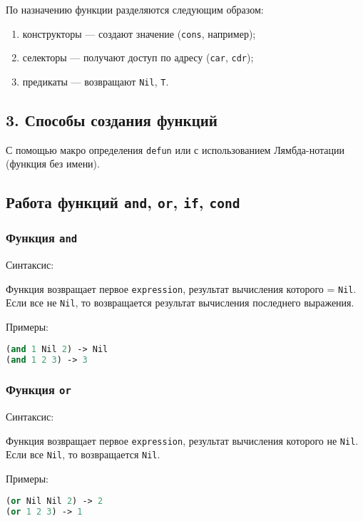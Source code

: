 По назначению функции разделяются следующим образом:
\begin{enumerate}
	\item конструкторы --- создают значение (\texttt{cons}, например);
	\item селекторы --- получают доступ по адресу (\texttt{car}, \texttt{cdr});
	\item предикаты --- возвращают \texttt{Nil}, \texttt{T}.
\end{enumerate}

\subsection*{3. Способы создания функций}

С помощью макро определения \texttt{defun} или с использованием Лямбда-нотации (функция без имени).

\subsection*{Работа функций \texttt{and}, \texttt{or}, \texttt{if}, \texttt{cond}}

\subsubsection*{Функция \texttt{and}}

Синтаксис: 

Функция возвращает первое \texttt{expression}, результат вычисления которого = \texttt{Nil}. Если все не \texttt{Nil}, то возвращается результат вычисления последнего выражения.

Примеры:
\begin{lstlisting}[label=7xd, language=lisp]
(and 1 Nil 2) -> Nil
(and 1 2 3) -> 3
\end{lstlisting}

\subsubsection*{Функция \texttt{or}}

Синтаксис: 

Функция возвращает первое \texttt{expression}, результат вычисления которого не \texttt{Nil}. Если все \texttt{Nil}, то возвращается \texttt{Nil}.

Примеры:
\begin{lstlisting}[label=7xd, language=lisp]
(or Nil Nil 2) -> 2
(or 1 2 3) -> 1
\end{lstlisting}

